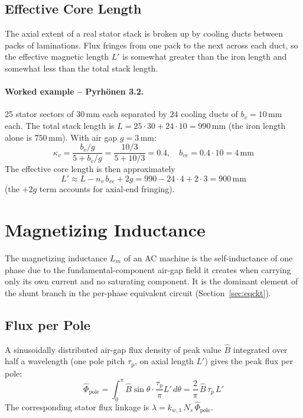 \documentclass[12pt,a4paper]{article}
\newcommand{\unit}[1]{\ensuremath{\,\mathrm{#1}}}
\begin{document}
\subsection{Effective Core Length}

The axial extent of a real stator stack is broken up by cooling ducts
between packs of laminations. Flux fringes from one pack to the next
across each duct, so the effective magnetic length $L'$ is somewhat
greater than the iron length and somewhat less than the total stack
length.

\paragraph{Worked example -- Pyrh\"onen 3.2.}
25 stator sectors of 30\unit{mm} each separated by 24 cooling ducts of
$b_v = 10\unit{mm}$ each. The total stack length is
$L = 25\cdot 30 + 24\cdot 10 = 990\unit{mm}$ (the iron length alone is
$750\unit{mm}$). With air gap $g = 3\unit{mm}$:
\begin{equation}
  \kappa_v = \frac{b_v/g}{5 + b_v/g} = \frac{10/3}{5 + 10/3} = 0.4,
  \quad
  b_{ve} = 0.4 \cdot 10 = 4\unit{mm}
\end{equation}
The effective core length is then approximately
\begin{equation}
  L' \approx L - n_v\,b_{ve} + 2g
         = 990 - 24\cdot 4 + 2\cdot 3
         = 900\unit{mm}
\end{equation}
(the $+2g$ term accounts for axial-end fringing).

\section{Magnetizing Inductance}
\label{sec:Lm}

The magnetizing inductance $L_m$ of an AC machine is the
self-inductance of one phase due to the fundamental-component
air-gap field it creates when carrying only its own current and no
saturating component. It is the dominant element of the shunt branch
in the per-phase equivalent circuit (Section~\ref{sec:eqckt}).

\subsection{Flux per Pole}

A sinusoidally distributed air-gap flux density of peak value
$\hat B$ integrated over half a wavelength (one pole pitch $\tau_p$,
on axial length $L'$) gives the peak flux per pole:
\begin{equation}
  \hat\Phi_\text{pole}
    = \int_0^\pi \hat B \sin\theta \cdot \frac{\tau_p}{\pi} L'\,d\theta
    = \frac{2}{\pi}\,\hat B\,\tau_p\,L'
  \label{eq:phi_pole}
\end{equation}
The corresponding stator flux linkage is
$\lambda = k_{w,1}\,N_s\,\hat\Phi_\text{pole}$.
\end{document}
